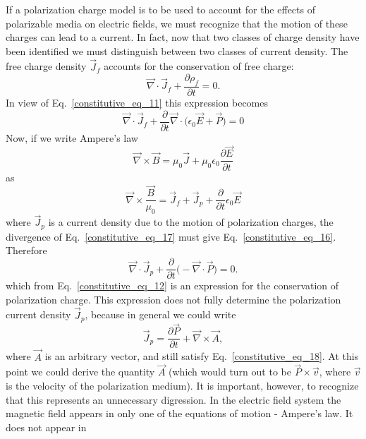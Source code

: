 \documentclass[11pt,a4paper,oneside]{book}
\numberwithin{equation}{section}
\theoremstyle{it}
\theoremstyle{definition}
\begin{document}
If a polarization charge model is to be used to account for the effects of polarizable  media on electric fields, we must recognize that the motion of these charges can lead to a current. In fact, now that two classes of charge density have been identified we must distinguish between two classes of current density. The free charge density $\vec{J}_f$ accounts for the conservation of free charge:
 \begin{equation}\label{constitutive_eq_15}
	\vec{\nabla}\cdot\vec{J}_f+\frac{\partial \rho_f}{\partial t}=0.
\end{equation}
In view of Eq.~\eqref{constitutive_eq_11} this expression becomes
 \begin{equation}\label{constitutive_eq_16}
	\vec{\nabla}\cdot\vec{J}_f+\frac{\partial }{\partial t}\vec{\nabla}\cdot\Big(\epsilon_0\vec{E}+\vec{P}\Big)=0
\end{equation}
Now, if we write Ampere's law 
 \begin{equation*}\label{}
	\vec{\nabla}\times\vec{B} = \mu_0\vec{J}+\mu_0\epsilon_0\frac{\partial \vec{E}}{\partial t}
\end{equation*}
as
 \begin{equation}\label{constitutive_eq_17}
	\vec{\nabla}\times\frac{\vec{B}}{\mu_0} = \vec{J}_f+\vec{J}_p+\frac{\partial }{\partial t}\epsilon_0\vec{E}
\end{equation}
where $\vec{J}_p$ is a current density due to the motion of polarization charges, the divergence of Eq.~\eqref{constitutive_eq_17} must give Eq.~\eqref{constitutive_eq_16}. Therefore
 \begin{equation}\label{constitutive_eq_18}
	\vec{\nabla}\cdot\vec{J}_p+\frac{\partial }{\partial t}\big(-\vec{\nabla}\cdot\vec{P}\big) = 0.
\end{equation}
which from Eq.~\eqref{constitutive_eq_12} is an expression for the conservation of polarization charge. This expression does not fully determine the polarization current density $\vec{J}_p$, because in general we could write
\begin{equation}\label{constitutive_eq_19}
 \vec{J}_p=\frac{\partial \vec{P}}{\partial t} + \vec{\nabla}\times\vec{A},
\end{equation}
where $\vec{A}$ is an arbitrary vector, and still satisfy Eq.~\eqref{constitutive_eq_18}. At this point we could derive the quantity $\vec{A}$ (which would turn out to be $\vec{P}\times\vec{v}$, where $\vec{v}$ is the velocity of the polarization medium). It is important, however, to recognize that this represents an unnecessary digression. In the electric field system the magnetic field appears in only one of the equations of motion - Ampere's law. It does not appear in 
\end{document}
